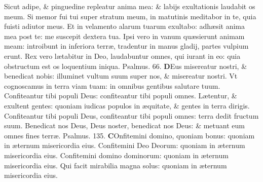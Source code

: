 \documentclass[a5paper,10pt]{book}
\def\ae{æ}
\begin{document}
\begin{multicols*}{2}
\newline \color{red} S\color{black}icut adipe, \& pinguedine repleatur anima mea: \& labijs exultationis laudabit os meum.
\newline \color{red} S\color{black}i memor fui tui super stratum meum, in matutinis meditabor in te, quia fuisti adiutor meus.
\newline \color{red} E\color{black}t in velamento alarum tuarum exultabo: adh\ae sit anima mea post te: me suscepit dextera tua.
\newline \color{red} I\color{black}psi vero in vanum qu\ae sierunt animam meam: introibunt in inferiora terr\ae , tradentur in manus gladij, partes vulpium erunt.
\newline \color{red} R\color{black}ex vero l\ae tabitur in Deo, laudabuntur omnes, qui iurant in eo: quia obstructum est os loquentium iniqua.
\newline \color{red} Psalmus. \hypertarget{ps66}{66.} \color{black}
\vspace{-.25em}
\lettrine[lines=2]{\bfseries \color{red} D}{}Eus misereatur nostri, \& benedicat nobis: illuminet vultum suum super nos, \& misereatur nostri.
\newline \color{red} V\color{black}t cognoscamus in terra viam tuam: in omnibus gentibus salutare tuum.
\newline \color{red} C\color{black}onfiteantur tibi populi Deus: confiteantur tibi populi omnes.
\newline \color{red} L\color{black}\ae tentur, \& exultent gentes: quoniam iudicas populos in \ae quitate, \& gentes in terra dirigis.
\newline \color{red} C\color{black}onfiteantur tibi populi Deus, confiteantur tibi populi omnes: terra dedit fructum suum.
\newline \color{red} B\color{black}enedicat nos Deus, Deus noster, benedicat nos Deus: \& metuant eum omnes fines terr\ae . \quad \color{red} Psalmus. \hypertarget{ps135}{135.} \color{black}
\vspace{-.25em}
\lettrine[lines=2]{\bfseries \color{red} C}{}Onfitemini domino, quoniam bonus: quoniam in \ae ternum misericordia eius.
\newline \color{red} C\color{black}onfitemini Deo Deorum: quoniam in \ae ternum misericordia eius.
\newline \color{red} C\color{black}onfitemini domino dominorum: quoniam in \ae ternum misericordia eius.
\newline \color{red} Q\color{black}ui facit mirabilia magna solus: quoniam in \ae ternum misericordia eius.

\end{multicols*}
\end{document}
